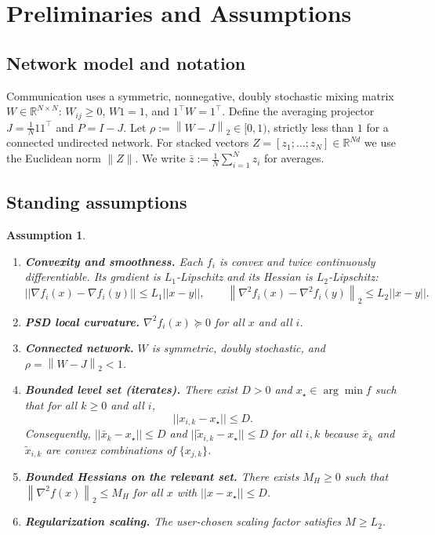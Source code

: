 \documentclass[11pt,a4paper]{article}
\def\one{1}%
\def\J{J}%
\def\Pmat{P}%
\def\norm#1{||#1||}%
\newtheorem{assumption}[theorem]{Assumption}
\newcommand{\R}{\mathbb{R}}
\newcommand{\one}{\mathbf{1}}
\newcommand{\norm}[1]{\left\|#1\right\|}
\newcommand{\normtwo}[1]{\left\|#1\right\|_2}
\newcommand{\J}{\left(\frac{1}{N}\one\one^\top\right)}
\newcommand{\Pmat}{I-\J}
\begin{document}
	\section{Preliminaries and Assumptions}\label{sec:prelim}
	\subsection{Network model and notation}
	Communication uses a symmetric, nonnegative, doubly stochastic mixing matrix $W\in\R^{N\times N}$:
	$W_{ij}\ge0$, $W\one=\one$, and $\one^\top W=\one^\top$.
	Define the averaging projector $\J=\frac{1}{N}\one\one^\top$ and $\Pmat=I-\J$.
	Let $\rho := \normtwo{W-\J}\in[0,1)$, strictly less than $1$ for a connected undirected network.
	For stacked vectors $Z=[z_1;\dots;z_N]\in\R^{Nd}$ we use the Euclidean norm $\|Z\|$.
	We write $\bar z:=\frac1N\sum_{i=1}^N z_i$ for averages.
	
	\subsection{Standing assumptions}
\begin{assumption}\label{ass:standing}
	\begin{enumerate}\itemsep2pt
		\item \textbf{Convexity and smoothness.}
		Each $f_i$ is convex and twice continuously differentiable.
		Its gradient is $L_1$-Lipschitz and its Hessian is $L_2$-Lipschitz:
		\[
		\norm{\nabla f_i(x)-\nabla f_i(y)}\le L_1\norm{x-y},
		\qquad
		\normtwo{\nabla^2 f_i(x)-\nabla^2 f_i(y)}\le L_2\norm{x-y}.
		\]
		\item \textbf{PSD local curvature.}
		$\nabla^2 f_i(x)\succeq0$ for all $x$ and all $i$.
		\item \textbf{Connected network.}
		$W$ is symmetric, doubly stochastic, and $\rho=\normtwo{W-\J}<1$.
		\item \textbf{Bounded level set (iterates).}
		There exist $D>0$ and $x_\star\in\arg\min f$ such that for all $k\ge 0$ and all $i$,
		\begin{equation}\label{eq:bounded_levelset}
			\norm{x_{i,k}-x_\star}\le D.
		\end{equation}
		Consequently, $\norm{\bar x_k-x_\star}\le D$ and $\norm{\tilde x_{i,k}-x_\star}\le D$
		for all $i,k$ because $\bar x_k$ and $\tilde x_{i,k}$ are convex combinations of $\{x_{j,k}\}$.
		\item \textbf{Bounded Hessians on the relevant set.}
		There exists $M_H\ge0$ such that $\normtwo{\nabla^2 f(x)}\le M_H$ for all $x$ with $\norm{x-x_\star}\le D$.
		\item \textbf{Regularization scaling.} The user-chosen scaling factor satisfies $M\ge L_2$.
	\end{enumerate}
\end{assumption}
	
\end{document}
